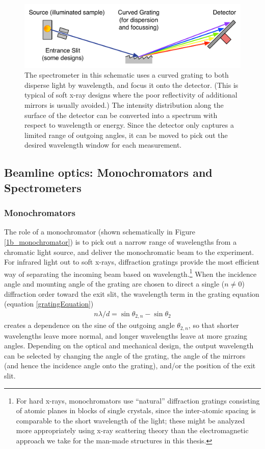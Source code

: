 \begin{figure}[htbp] %
   \centering
   \includegraphics[scale=0.8]{../data/Chapter1/1b_spectrometerSchematic/1b_rowlandSpectrometer.pdf} 
   \caption{The spectrometer in this schematic uses a curved grating to both disperse light by wavelength, and focus it onto the detector.  (This is typical of soft x-ray designs where the poor reflectivity of additional mirrors is usually avoided.)  The intensity distribution along the surface of the detector can be converted into a spectrum with respect to wavelength or energy.  Since the detector only captures a limited range of outgoing angles, it can be moved to pick out the desired wavelength window for each measurement.}
   \label{1b_rowlandSpectrometer}
\end{figure}





\subsection{Beamline optics: Monochromators and Spectrometers}
\subsubsection{Monochromators}
The role of a monochromator (shown schematically in Figure \ref{1b_monochromator}) is to pick out a narrow range of wavelengths from a chromatic light source, and deliver the monochromatic beam to the experiment.  For infrared light out to soft x-rays, diffraction gratings provide the most efficient way of separating the incoming beam based on wavelength.\footnote{For hard x-rays, monochromators use ``natural'' diffraction gratings consisting of atomic planes in blocks of single crystals, since the inter-atomic spacing is comparable to the short wavelength of the light; these might be analyzed more appropriately using x-ray scattering theory than the electromagnetic approach we take for the man-made structures in this thesis.}  When the incidence angle and mounting angle of the grating are chosen to direct a single ($n\neq0$) diffraction order toward the exit slit, the wavelength term in the grating equation (equation \ref{gratingEquation})
\begin{eqnarray*}
n\lambda / d = \sin\theta_{2,n} - \sin\theta_{2}
\end{eqnarray*}
creates a dependence on the sine of the outgoing angle $\theta_{2,n}$, so that shorter wavelengths leave more normal, and longer wavelengths leave at more grazing angles.  Depending on the optical and mechanical design, the output wavelength can be selected by changing the angle of the grating, the angle of the mirrors (and hence the incidence angle onto the grating), and/or the position of the exit slit.

